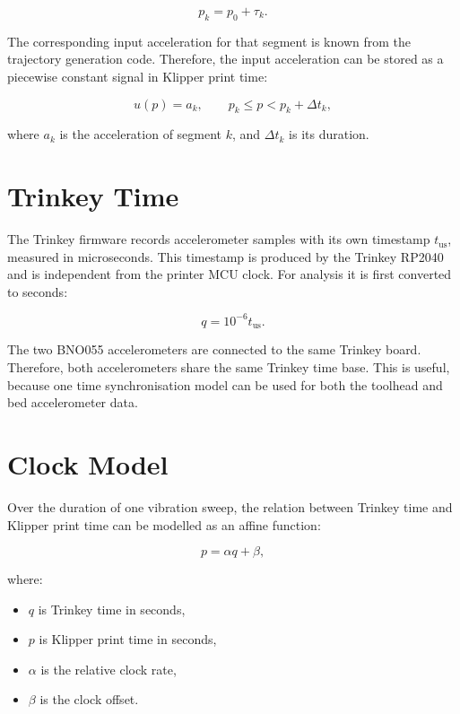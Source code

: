 \documentclass[11pt,a4paper]{article}
\begin{document}
\begin{equation}
    p_k = p_0 + \tau_k.
\end{equation}

The corresponding input acceleration for that segment is known from the
trajectory generation code. Therefore, the input acceleration can be stored as a
piecewise constant signal in Klipper print time:

\begin{equation}
    u(p) = a_k, \qquad p_k \leq p < p_k + \Delta t_k,
\end{equation}

where \(a_k\) is the acceleration of segment \(k\), and \(\Delta t_k\) is its
duration.

\section{Trinkey Time}

The Trinkey firmware records accelerometer samples with its own timestamp
\(t_{\mathrm{us}}\), measured in microseconds. This timestamp is produced by the
Trinkey RP2040 and is independent from the printer MCU clock. For analysis it is
first converted to seconds:

\begin{equation}
    q = 10^{-6} t_{\mathrm{us}}.
\end{equation}

The two BNO055 accelerometers are connected to the same Trinkey board. Therefore,
both accelerometers share the same Trinkey time base. This is useful, because
one time synchronisation model can be used for both the toolhead and bed
accelerometer data.

\section{Clock Model}

Over the duration of one vibration sweep, the relation between Trinkey time and
Klipper print time can be modelled as an affine function:

\begin{equation}
    p = \alpha q + \beta,
    \label{eq:clock_model}
\end{equation}

where:

\begin{itemize}
    \item \(q\) is Trinkey time in seconds,
    \item \(p\) is Klipper print time in seconds,
    \item \(\alpha\) is the relative clock rate,
    \item \(\beta\) is the clock offset.
\end{itemize}
\end{document}
